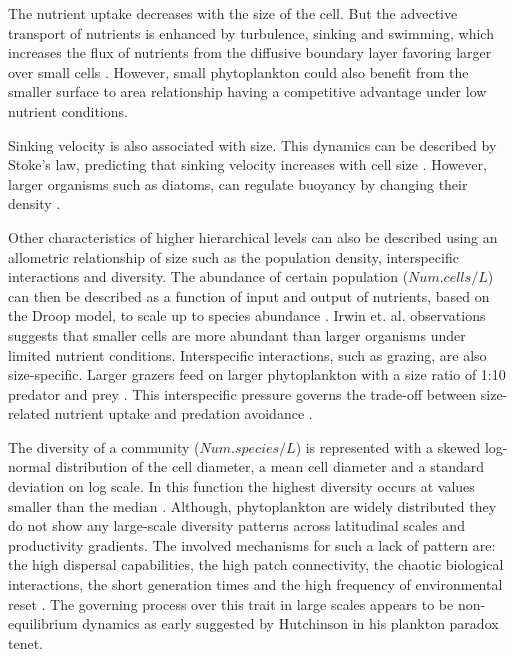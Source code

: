 The nutrient uptake decreases with the size of the cell. But the advective transport of nutrients is enhanced by turbulence, sinking and swimming, which increases the flux of nutrients from the diffusive boundary layer favoring larger over small cells \citep{Kiorboe1993}. However, small phytoplankton could also benefit from the smaller surface to area relationship having a competitive advantage under low nutrient conditions.

Sinking velocity is also associated with size. This dynamics can be described by Stoke's law, predicting that sinking velocity increases with cell size \citep{Reynolds2006}. However, larger organisms such as diatoms, can regulate buoyancy by changing their density \citep{Reynolds2006}. 

Other characteristics of higher hierarchical levels can also be described using an allometric relationship of size such as the population density, interspecific interactions and diversity. The abundance of certain population ($Num.cells/L$) can then be described as a function of input and output of nutrients, based on the Droop model, to scale up to species abundance \citep{Irwin2006}. Irwin et. al. observations suggests that smaller cells are more abundant than larger organisms under limited nutrient conditions. 
Interspecific interactions, such as grazing, are also size-specific. Larger grazers feed on larger phytoplankton with a size ratio of 1:10 predator and prey \citep{Kiorboe1993}. This interspecific pressure governs the trade-off between size-related nutrient uptake and predation avoidance \citep{Thingstad2005,Naselli-Flores2007}. 

The diversity of a community ($Num.species /L$) is represented with a skewed log-normal distribution of the cell diameter, a mean cell diameter and a standard deviation on log scale. In this function the highest diversity occurs at values smaller than the median \citep{Irwin2006, Cermeno2008a, Finkel2009a}. Although, phytoplankton are widely distributed they do not show any large-scale diversity patterns across latitudinal scales and productivity gradients. The involved mechanisms for such a lack of pattern are: the high dispersal capabilities, the high patch connectivity, the chaotic biological interactions, the short generation times and the high frequency of environmental reset \citep{Cermeno2008}. The governing process over this trait in large scales appears to be non-equilibrium dynamics as early suggested by Hutchinson\citeyearpar {Hutchinson1961} in his plankton paradox tenet.

